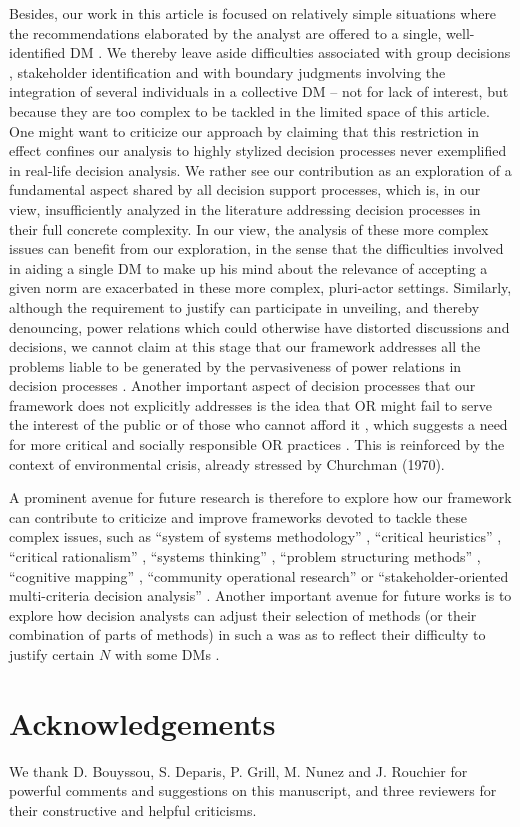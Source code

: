 \documentclass[preprint, french, english, 11pt, authoryear]{elsarticle}%
\begin{document}
Besides, our work in this article is focused on relatively simple situations where the recommendations elaborated by the analyst are offered to a single, well-identified \ac{DM}
.
We thereby leave aside difficulties associated with group decisions \citep{jackson_towards_1984}, stakeholder identification \citep{wang_systemic_2015} and with boundary judgments involving the integration of several individuals in a collective \ac{DM}
 \citep{midgley_systemic_2000}
-- not for lack of interest, but because they are too complex to be tackled in the limited space of this article. One might want to criticize our approach by claiming that this restriction in effect confines our analysis to highly stylized decision processes never exemplified in real-life decision analysis.
We rather see our contribution as an exploration of a fundamental aspect shared by all decision support processes, which is, in our view, insufficiently analyzed in the literature addressing decision processes in their full concrete complexity.
In our view, the analysis of these more complex issues can benefit from our exploration, in the sense that the difficulties involved in aiding a single \ac{DM}
 to make up his mind about the relevance of accepting a given norm are exacerbated in these more complex, pluri-actor settings. 
Similarly, although the requirement to justify can participate in unveiling, and thereby denouncing, power relations which could otherwise have distorted discussions and decisions, 
we cannot claim at this stage that our framework addresses all the problems liable to be generated by the pervasiveness of power relations in decision processes \citep{cronin_issues_2014}.
Another important aspect of decision processes that our framework does not explicitly addresses is the idea that \ac{OR}
 might fail to serve the interest of the public or of those who cannot afford it \citep{rosenhead_report_1986}, 
which suggests a need for more critical and socially responsible OR practices \citep{jackson_systems_2000,ulrich_beyond_2003}. This is reinforced by the context of environmental crisis, already stressed by Churchman (1970).

A prominent avenue for future research is therefore to explore how our framework can contribute to criticize and improve frameworks devoted to tackle these complex issues, such as ``system of systems methodology'' \citep{jackson_towards_1984}, ``critical heuristics'' \citep{ulrich_critical_1987}, 
``critical rationalism'' \citep{ormerod_critical_2014}, ``systems thinking'' \citep{mingers_review_2010}, ``problem structuring methods'' \citep{hector_problem-structuring_2009}, ``cognitive mapping'' \citep{eden_analyzing_2004}, ``community operational research'' \citep{johnson_emerging_2018} or 
``stakeholder-oriented multi-criteria decision analysis'' \citep{de_brucker_multi-criteria_2013}. Another important avenue for future works is to explore how decision analysts can adjust their selection of methods (or their combination of parts of methods) in such a was as to reflect their difficulty to justify certain $N$ with some \acp{DM}
 \citep{mingers_towards_1997}.


\setcounter{secnumdepth}{0}
\section{Acknowledgements}
We thank D. Bouyssou, S. Deparis, P. Grill, M. Nunez and J. Rouchier for powerful comments and suggestions on this manuscript, and three reviewers for their constructive and helpful criticisms.


\end{document}
